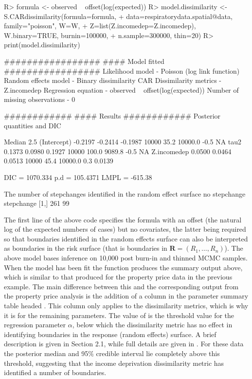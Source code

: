 \documentclass[article,shortnames,nojss]{jss}
\begin{document}
\begin{CodeInput}
R> formula <- observed ~ offset(log(expected))
R> model.dissimilarity <- S.CARdissimilarity(formula=formula, 
+    data=respiratorydata.spatial@data, family="poisson", W=W, 
+    Z=list(Z.incomedep=Z.incomedep), W.binary=TRUE, burnin=100000, 
+    n.sample=300000, thin=20)
R> print(model.dissimilarity)
\end{CodeInput}


\begin{CodeOutput}
#################
#### Model fitted
#################
Likelihood model - Poisson (log link function) 
Random effects model - Binary dissimilarity CAR 
Dissimilarity metrics -  Z.incomedep 
Regression equation - observed ~ offset(log(expected))
Number of missing observations - 0

############
#### Results
############
Posterior quantities and DIC

             Median    2.5%
(Intercept) -0.2197 -0.2414 -0.1987    10000     35.2     10000.0        -0.5        NA
tau2         0.1373  0.0980  0.1927    10000    100.0      9089.8        -0.5        NA
Z.incomedep  0.0500  0.0464  0.0513    10000     45.4     10000.0         0.3    0.0139

DIC =  1070.334       p.d =  105.4371       LMPL =  -615.38 

The number of stepchanges identified in the random effect surface
     no stepchange stepchange
[1,]           261         99
\end{CodeOutput}

The first line of the above code specifies the formula with an offset (the natural log of the expected numbers of cases) but no covariates, the latter being required so that boundaries identified in the random effects surface can also be interpreted as boundaries in the risk surface (that is boundaries in $\mathbf{R}=(R_{1},\ldots,R_{n})$). The above model bases inference on 10,000 post burn-in and thinned MCMC samples. When the model has been fit the  function produces the summary output above, which is similar to that produced for the property price data in the previous example. The main difference between this and the corresponding output from the property price analysis is the addition of a column in the parameter summary table headed . This column only applies to the dissimilarity metrics, which is why it is  for the remaining parameters. The value of  is the threshold value for the regression parameter $\alpha$, below which the dissimilarity metric has no effect in identifying boundaries in the response (random effects) surface. A brief description is given in Section 2.1, while full details are given in \cite{lee2012}. For these data the posterior median and 95$\%$ credible interval lie completely above this threshold, suggesting that the income deprivation dissimilarity metric has identified a number of boundaries.
\end{document}
